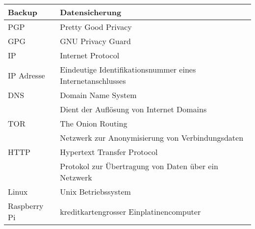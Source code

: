 \begin{tabular*}{\textwidth}{|p{}|p{}|}
  Backup & Datensicherung \\ \hline
  PGP & Pretty Good Privacy \\ \hline
  GPG & GNU Privacy Guard \\ \hline
  IP & Internet Protocol \\ \hline
  IP Adresse & Eindeutige Identifikationsnummer eines Internetanschlusses \\ \hline
  DNS & Domain Name System \\
      & Dient der Auflösung von Internet Domains \\ \hline
  TOR & The Onion Routing \\
      & Netzwerk zur Anonymisierung von Verbindungsdaten \\ \hline
  HTTP & Hypertext Transfer Protocol \\
       & Protokol zur Übertragung von Daten über ein Netzwerk \\ \hline
  Linux & Unix Betriebssystem \\ \hline
  Raspberry Pi & kreditkartengrosser Einplatinencomputer \\ \hline
\end{tabular*}
